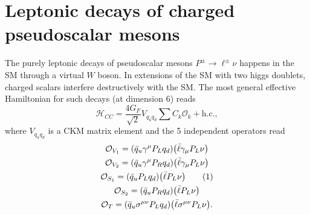 \documentclass[preprint,11pt]{elsarticle}
\newcommand\numberthis{\addtocounter{equation}{1}\tag{\theequation}}
\begin{document}
\section{Leptonic decays of charged pseudoscalar mesons}\label{app:plnu}
The purely leptonic decays of pseudoscalar mesons $P^\pm\to\ell^\pm\nu$ happens in the SM through a virtual $W$ boson. In extensions of the SM with two higgs doublets, charged scalars interfere destructively with the SM. The most general effective Hamiltonian for such decays (at dimension 6) reads
\begin{equation}
    \mathcal{H}_{CC}=\frac{4G_F}{\sqrt{2}}V_{q_uq_d}\sum C_k\mathcal{O}_k+\mathrm{h.c.},
\end{equation}
where $V_{q_uq_d}$ is a CKM matrix element and the 5 independent operators read
\begin{gather*}
    \mathcal{O}_{V_1}=\qty(\bar q_u\gamma^\mu P_Lq_d)\qty(\bar\ell\gamma_\mu P_L\nu)\\
    \mathcal{O}_{V_2}=\qty(\bar q_u\gamma^\mu P_Rq_d)\qty(\bar\ell\gamma_\mu P_L\nu)\\
    \mathcal{O}_{S_1}=\qty(\bar q_uP_Lq_d)\qty(\bar\ell P_L\nu)\numberthis{}\\
    \mathcal{O}_{S_2}=\qty(\bar q_uP_Rq_d)\qty(\bar\ell P_L\nu)\\
    \mathcal{O}_{T}=\qty(\bar q_u\sigma^{\mu\nu} P_Lq_d)\qty(\bar\ell\sigma^{\mu\nu} P_L\nu).
\end{gather*}
\end{document}
